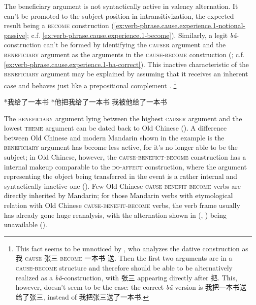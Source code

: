 \documentclass[UTF8, a4paper, oneside, scheme=plain, 12pt]{ctexrep}
\newcommand*{\citepage}[1]{p.~{#1}}
\newcommand{\form}[1]{\emph{#1}}
\newcommand*{\category}[1]{\textsc{#1}}
\begin{document}
The beneficiary argument 
is not syntactically active in valency alternation.
It can't be promoted to the subject position 
in intransitivization, 
the expected result being a \category{become} construction
(\ref{ex:verb-phrase.cause.experience.1-notional-passive}; 
c.f. \ref{ex:verb-phrase.cause.experience.1-become}).
Similarly, a legit \form{bǎ}-construction can't be formed by  
identifying the \category{causer} argument and  
the \category{beneficiary} argument 
as the arguments in the \category{cause}-\category{become} construction 
(; c.f. \ref{ex:verb-phrase.cause.experience.1-ba-correct}).
This inactive characteristic of the \category{beneficiary} argument
may be explained by assuming that it receives an inherent case
and behaves just like a prepositional complement
\citep{huang2007}.%
\footnote{
    This fact seems to be unnoticed by \citet[\citepage{112}]{deng2010formal},
    who analyzes the dative construction 
    as 我 \category{cause} 张三 \category{become} 一本书 送.
    Then the first two arguments are in a \category{cause}-\category{become} structure 
    and therefore should be able to be alternatively 
    realized as a \form{bǎ}-construction,
    with 张三 appearing directly after 把.
    This, however, doesn't seem to be the case: 
    the correct \form{bǎ}-version is 我把一本书送给了张三,
    instead of 我把张三送了一本书.
} 

\begin{exe}
    \ex\label{ex:verb-phrase.cause.experience.1-notional-passive}  *我给了一本书
    \ex\label{ex:verb-phrase.cause.experience.1-ba} *他把我给了一本书
    \ex *我被他给了一本书
\end{exe}

The \category{beneficiary} argument lying between the highest \category{causer} argument 
and the lowest \category{theme} argument 
can be dated back to Old Chinese
().
A difference between Old Chinese and modern Mandarin shown in the example 
is the \category{beneficiary} argument 
has become less active, 
for it's no longer able to be the subject; 
in Old Chinese, however, the \category{cause}-\category{benefict}-\category{become}
construction has a internal makeup comparable to the 
\category{do}-\category{affect} construction,
where the argument representing the object being transferred in the event 
is a rather internal and syntactically inactive one 
().
Few Old Chinese \category{cause}-\category{benefit}-\category{become} verbs 
are directly inherited by Mandarin;
for those Mandarin verbs with etymological relation 
with Old Chinese \category{cause}-\category{benefit}-\category{become} verbs,
the verb frame usually has already gone huge reanalysis,
with the alternation shown in 
(, 
) being unavailable
().
\end{document}
